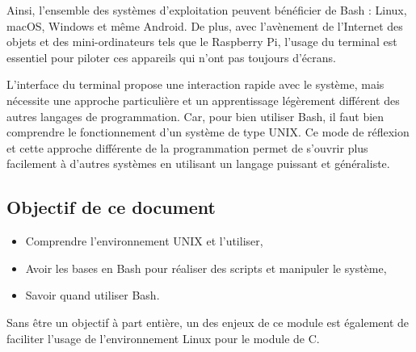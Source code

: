 Ainsi, l'ensemble des systèmes d'exploitation peuvent bénéficier de Bash : Linux, macOS, Windows et même Android. De plus, avec l'avènement de l'Internet des objets et des mini-ordinateurs tels que le Raspberry Pi, l'usage du terminal est essentiel pour piloter ces appareils qui n'ont pas toujours d'écrans.

L'interface du terminal propose une interaction rapide avec le système, mais nécessite une approche particulière et un apprentissage légèrement différent des autres langages de programmation. Car, pour bien utiliser Bash, il faut bien comprendre le fonctionnement d'un système de type UNIX. Ce mode de réflexion et cette approche différente de la programmation permet de s'ouvrir plus facilement à d'autres systèmes en utilisant un langage puissant et généraliste.

\subsection*{Objectif de ce document}
\begin{itemize}
    \item Comprendre l'environnement UNIX et l'utiliser,
    \item Avoir les bases en Bash pour réaliser des scripts et manipuler le système,
    \item Savoir quand utiliser Bash.
\end{itemize}

Sans être un objectif à part entière, un des enjeux de ce module est également de faciliter l'usage de l'environnement Linux pour le module de C.